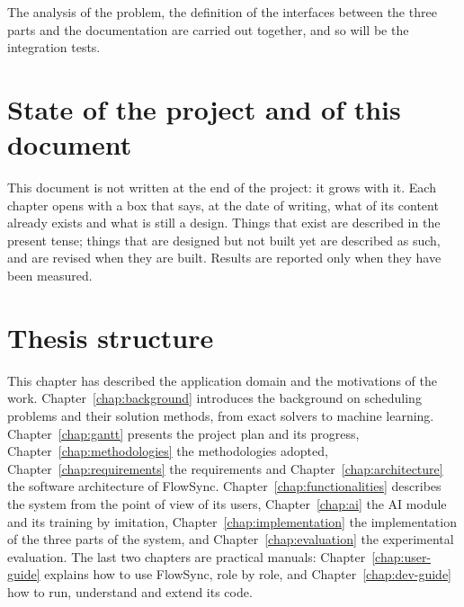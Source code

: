The analysis of the problem, the definition of the interfaces between the three parts and the
documentation are carried out together, and so will be the integration tests.

\section{State of the project and of this document}
\label{sec:doc-state}

This document is not written at the end of the project: it grows with it. Each chapter opens
with a box that says, at the date of writing, what of its content already exists and what is
still a design. Things that exist are described in the present tense; things that are designed
but not built yet are described as such, and are revised when they are built. Results are
reported only when they have been measured.


\section{Thesis structure}
\label{sec:structure}
This chapter has described the application domain and the motivations of the work.
Chapter~\ref{chap:background} introduces the background on scheduling problems and their
solution methods, from exact solvers to machine learning. Chapter~\ref{chap:gantt} presents the
project plan and its progress, Chapter~\ref{chap:methodologies} the methodologies adopted,
Chapter~\ref{chap:requirements} the requirements and Chapter~\ref{chap:architecture} the
software architecture of FlowSync. Chapter~\ref{chap:functionalities} describes the system from
the point of view of its users, Chapter~\ref{chap:ai} the AI module and its training by
imitation, Chapter~\ref{chap:implementation} the implementation of the three parts of the
system, and Chapter~\ref{chap:evaluation} the experimental evaluation. The last two chapters are
practical manuals: Chapter~\ref{chap:user-guide} explains how to use FlowSync, role by role, and
Chapter~\ref{chap:dev-guide} how to run, understand and extend its code.

